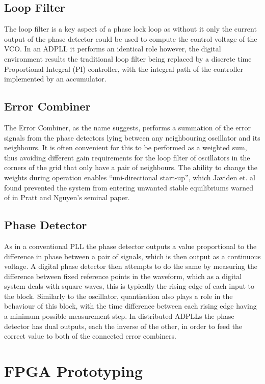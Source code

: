 \documentclass[conference]{IEEEtran}
\begin{document}
\subsection{Loop Filter}
The loop filter is a key aspect of a phase lock loop as without it only the current output of the phase detector could be used to compute the control voltage of the VCO.
In an ADPLL it performs an identical role however, the digital environment results the traditional loop filter being replaced by a discrete time Proportional Integral (PI) controller, with the integral path of the controller implemented by an accumulator.
\subsection{Error Combiner}
The Error Combiner, as the name suggests, performs a summation of the error signals from the phase detectors lying between any neighbouring oscillator and its neighbours. It is often convenient for this to be performed as a weighted sum, thus avoiding different gain requirements for the loop filter of oscillators in the corners of the grid that only have a pair of neighbours. The ability to change the weights during operation enables ``uni-directional start-up'', which Javiden et. al \cite{javidan2011all} found prevented the system from entering unwanted stable equilibriums warned of in Pratt and Nguyen's seminal paper.
\subsection{Phase Detector}
As in a conventional PLL the phase detector outputs a value proportional to the difference in phase between a pair of signals, which is then output as a continuous voltage.
A digital phase detector then attempts to do the same by measuring the difference between fixed reference points in the waveform, which as a digital system deals with square waves, this is typically the rising edge of each input to the block.
Similarly to the oscillator, quantisation also plays a role in the behaviour of this block, with the time difference between each rising edge having a minimum possible measurement step.
In distributed ADPLLs the phase detector has dual outputs, each the inverse of the other, in order to feed the correct value to both of the connected error combiners. 

\section{FPGA Prototyping}
\end{document}
